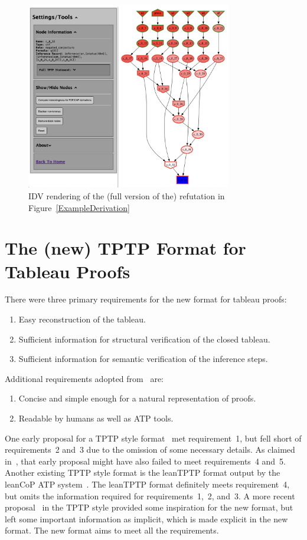 \documentclass[runningheads]{llncs}
\begin{document}
\begin{figure}[htb]
\centering
\includegraphics[width=0.8\textwidth]{PaperFOFIDV.pdf}
\vspace*{-1em}
\caption{IDV rendering of the (full version of the) refutation in Figure~\ref{ExampleDerivation}}
\label{IDVDerivation}
\end{figure}

\section{The (new) TPTP Format for Tableau Proofs}
\label{Tableau}

There were three primary requirements for the new format for tableau proofs:
\begin{enumerate}
\item Easy reconstruction of the tableau.
\item Sufficient information for structural verification of the closed tableau.
\item Sufficient information for semantic verification of the inference steps.
\end{enumerate}
Additional requirements adopted from~\cite{OH23} are:
\begin{enumerate}[resume]
\item Concise and simple enough for a natural representation of proofs.
\item Readable by humans as well as ATP tools.
\end{enumerate}
One early proposal for a TPTP style format~\cite{OS10} met requirement~1, but fell short
of requirements~2 and~3 due to the omission of some necessary details. 
As claimed in~\cite{OH23}, that early proposal might have also failed to meet requirements~4 and~5.
Another existing TPTP style format is the leanTPTP format output by the leanCoP ATP 
system~\cite{OB03}.
The leanTPTP format definitely meets requirement~4, but omits the information required for 
requirements~1,~2, and~3.
A more recent proposal~\cite{OH23} in the TPTP style provided some inspiration for the new format,
but left some important information as implicit, which is made explicit in the new format.
The new format aims to meet all the requirements.
\end{document}
